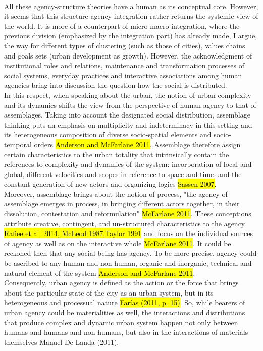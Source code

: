\documentclass[11pt]{report}
\begin{document}
\\
All these agency-structure theories have a human as its conceptual core. However, it seems that this structure-agency integration rather returns the systemic view of the world. It is more of a counterpart of micro-macro integration, where the previous division (emphasized by the integration part) has already made, I argue, the way for different types of clustering (such as those of cities), values chains and goals sets (urban development as growth).
However, the acknowledgment of institutional roles and relations, maintenance and transformation processes of social systems, everyday practices and interactive associations among human agencies bring into discussion the question how the social is distributed.
\\
In this respect, when speaking about the urban, the notion of urban complexity and its dynamics shifts the view from the perspective of human agency to that of assemblages. Taking into account the designated social distribution, assemblage thinking puts an emphasis on multiplicity and indeterminacy in this setting and its heterogeneous composition of diverse socio-spatial elements and socio-temporal orders \hl{Anderson and McFarlane 2011}. Assemblage therefore assign certain characteristics to the urban totality that intrinsically contain the references to complexity and dynamics of the system: incorporation of local and global, different velocities and scopes in reference to space and time, and the constant generation of new actors and organizing logics \hl{Sassen 2007}.
\\
Moreover, assemblage brings about the notion of process, "the agency of assemblage emerges in process, in bringing different actors together, in their dissolution,  contestation  and  reformulation"
\hl{McFarlane 2011}.
These conceptions attribute creative, contingent, and un-structured characteristics to the agency \hl{Rafiee et al. 2014, McLeod 1987,Taylor 1991} and focus on the individual sources of agency as well as on the interactive whole \hl{McFarlane 2011}.
It could be reckoned then that any social being has agency. To be more precise, agency could be ascribed to any human and non-human, organic and inorganic, technical and natural element of the system \hl{Anderson and McFarlane 2011}.
\\
Consequently, urban agency is defined as the action or the force that brings about the particular state of the city as an urban system, but in its heterogeneous and processual nature \hl{Farías (2011, p. 15)}. 
So, while bearers of urban agency could be materialities as well, the interactions and distributions that produce complex and dynamic urban system happen not only between humans and humans and non-humans, but also in the interactions of materials themselves Manuel De Landa (2011).
\end{document}
